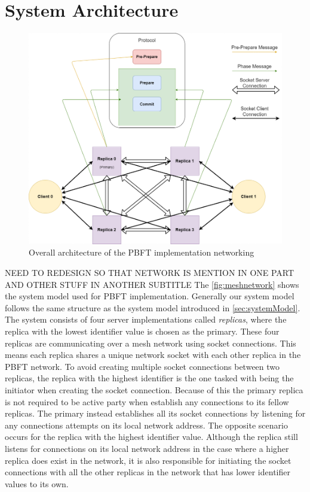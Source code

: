 \section{System Architecture}
\begin{figure}
	\centering
	\includegraphics[width=\linewidth]{figures/meshnetwork}
	\caption{Overall architecture of the PBFT implementation networking}
	\label{fig:meshnetwork}
\end{figure}
NEED TO REDESIGN SO THAT NETWORK IS MENTION IN ONE PART AND OTHER STUFF IN ANOTHER SUBTITLE
The \autoref{fig:meshnetwork} shows the system model used for PBFT implementation. Generally our system model follows the same structure as the system model introduced in \autoref{sec:systemModel}. The system consists of four server implementations called \emph{replicas}, where the replica with the lowest identifier value is chosen as the primary. These four replicas are communicating over a mesh network using socket connections. This means each replica shares a unique network socket with each other replica in the PBFT network. To avoid creating multiple socket connections between two replicas, the replica with the highest identifier is the one tasked with being the initiator when creating the socket connection. Because of this the primary replica is not required to be active party when establish any connections to its fellow replicas. The primary instead establishes all its socket connections by listening for any connections attempts on its local network address. The opposite scenario occurs for the replica with the highest identifier value. Although the replica still listens for connections on its local network address in the case where a higher replica does exist in the network, it is also responsible for initiating the socket connections with all the other replicas in the network that has lower identifier values to its own.

